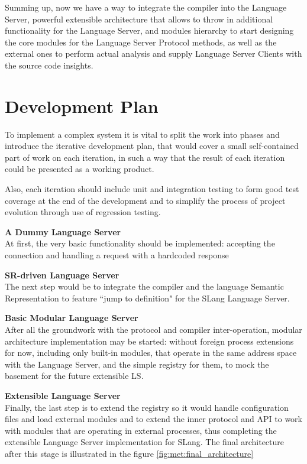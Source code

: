 Summing up, now we have a way to integrate the compiler into the Language Server, powerful extensible architecture that allows to throw in additional functionality for the Language Server, and modules hierarchy to start designing the core modules for the Language Server Protocol methods, as well as the external ones to perform actual analysis and supply Language Server Clients with the source code insights.

\section{Development Plan}
To implement a complex system it is vital to split the work into phases and introduce
the iterative development plan, that would cover a small self-contained part of work on each iteration,
in such a way that the result of each iteration could be presented as a working product.

Also, each iteration should include unit and integration testing to form good test coverage
at the end of the development and to simplify the process of project evolution through use of regression testing.

\textbf{A Dummy Language Server} \\
At first, the very basic functionality should be implemented: accepting the connection and handling a request with a hardcoded response

\textbf{SR-driven Language Server}\\
The next step would be to integrate the compiler and the language Semantic Representation
to feature ``jump to definition" for the SLang Language Server.

\textbf{Basic Modular Language Server}\\
After all the groundwork with the protocol and compiler inter-operation,
modular architecture implementation may be started: without foreign process extensions for now,
including only built-in modules, that operate in the same address space with the Language Server,
and the simple registry for them, to mock the basement for the future extensible LS.

\textbf{Extensible Language Server}\\
Finally, the last step is to extend the registry so it would handle configuration files
and load external modules and to extend the inner protocol and API to work with modules that are operating
in external processes, thus completing the extensible Language Server implementation for SLang.
The final architecture after this stage is illustrated in the figure \ref{fig:met:final_architecture}

